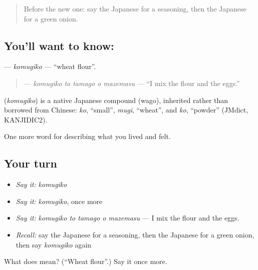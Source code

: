 \label{lesson:JA-C472-komugiko}



\begin{quote}
Before the new one: say the Japanese for a seasoning, then the Japanese for a green onion.
\end{quote}

\subsection*{You'll want to know: }
\textbf{} — \emph{komugiko} — \textquotedblleft{}wheat flour\textquotedblright{}.

\begin{quote}
\textbf{  } — \emph{komugiko to tamago o mazemasu} — \textquotedblleft{}I mix the flour and the eggs.\textquotedblright{}
\end{quote}

\begin{cousinweb}
\textbf{} (\emph{komugiko}) is a native Japanese compound (wago), inherited rather than borrowed from Chinese: \emph{ko}, \textquotedblleft{}small\textquotedblright{}, \emph{mugi}, \textquotedblleft{}wheat\textquotedblright{}, and \emph{ko}, \textquotedblleft{}powder\textquotedblright{} (JMdict, KANJIDIC2).
\end{cousinweb}

\begin{grammarlens}[title={What you've built}]
One more word for describing what you lived and felt.
\end{grammarlens}

\subsection*{Your turn}
\begin{itemize}
\raggedright
  \item \emph{Say it:} \emph{komugiko}
  \item \emph{Say it:} \emph{komugiko}, once more
  \item \emph{Say it:} \emph{komugiko to tamago o mazemasu} — I mix the flour and the eggs.
  \item \emph{Recall:} say the Japanese for a seasoning, then the Japanese for a green onion, then say \emph{komugiko} again
\end{itemize}

\begin{tcolorbox}[breakable,colback=teal!4,colframe=teal!35!black,title={Before you move on}]
What does  mean? (\textquotedblleft{}Wheat flour\textquotedblright{}.) Say it once more.
\end{tcolorbox}
